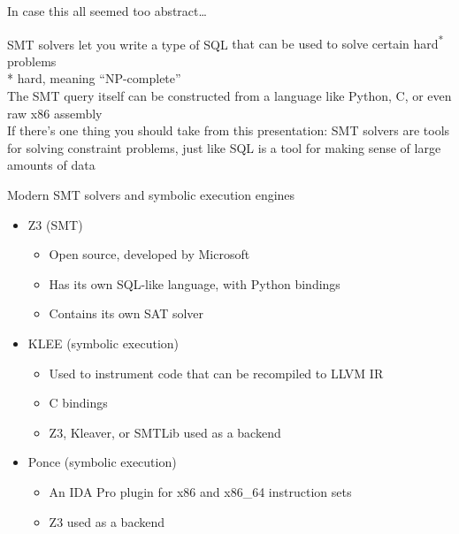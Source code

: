 \begin{frame}{In case this all seemed too abstract\ldots}
    \begin{center}
        {\Large
            SMT solvers let you write a type of SQL \alert{that
            can be used to solve certain hard\textsuperscript{*} problems}
        } \pause \\
        * hard, meaning ``NP-complete'' \pause \\
        \vspace{0.25in}
        {\Large
            The SMT query itself can be constructed from a language like
            Python, C, or even raw x86 assembly
        } \pause \\
        \vspace{0.25in}
        {\Large
            If there's one thing you should take from this presentation:
            SMT solvers are tools for solving constraint problems, just like
            SQL is a tool for making sense of large amounts of data
        }
    \end{center}
\end{frame}

\begin{frame}{Modern SMT solvers and symbolic execution engines}
    \begin{itemize}
        \item<1-> \alert<4->{Z3} (SMT)
        \begin{itemize}
            \item<1-> Open source, developed by Microsoft
            \item<1-> Has its own SQL-like language, with Python bindings
            \item<1-> Contains its own SAT solver
        \end{itemize}
        \item<2-> KLEE (symbolic execution)
        \begin{itemize}
            \item<2-> Used to instrument code that can be recompiled to LLVM IR
            \item<2-> C bindings
            \item<2-> Z3, Kleaver, or SMTLib used as a backend
        \end{itemize}
        \item<3-> Ponce (symbolic execution)
        \begin{itemize}
            \item<3-> An IDA Pro plugin for x86 and x86\_64 instruction sets
            \item<3-> Z3 used as a backend
        \end{itemize}
    \end{itemize}

\end{frame}

